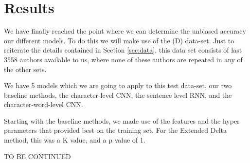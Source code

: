 \section{Results} \label{sec:results}

We have finally reached the point where we can determine the unbiased accuracy
our different models. To do this we will make use of the (D) data-set. Just
to reiterate the details contained in Section \ref{sec:data}, this data set
consists of last 3558 authors available to us, where none of these authors are
repeated in any of the other sets.

We have 5 models which we are going to apply to this test data-set,
our two baseline methods, the character-level \gls{CNN}, the sentence
level RNN, and the character-word-level \gls{CNN}.

Starting with the baseline methods, we made use of the features and the
hyper parameters that provided best on the training set.
For the Extended Delta method, this was a K value, and a p value of 1.

TO BE CONTINUED


